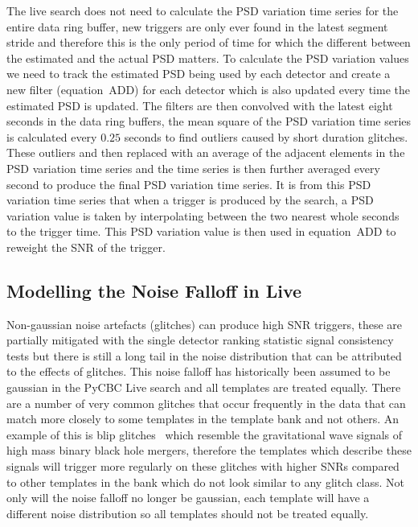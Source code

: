 The live search does not need to calculate the PSD variation time series for the entire data ring buffer, new triggers are only ever found in the latest segment stride and therefore this is the only period of time for which the different between the estimated and the actual PSD matters. To calculate the PSD variation values we need to track the estimated PSD being used by each detector and create a new filter (equation~ADD) for each detector which is also updated every time the estimated PSD is updated. The filters are then convolved with the latest eight seconds in the data ring buffers, the mean square of the PSD variation time series is calculated every $0.25$ seconds to find outliers caused by short duration glitches. These outliers and then replaced with an average of the adjacent elements in the PSD variation time series and the time series is then further averaged every second to produce the final PSD variation time series. It is from this PSD variation time series that when a trigger is produced by the search, a PSD variation value is taken by interpolating between the two nearest whole seconds to the trigger time. This PSD variation value is then used in equation~ADD to reweight the SNR of the trigger.

\subsection{\label{pycbclive-template-fits}Modelling the Noise Falloff in Live}

Non-gaussian noise artefacts (glitches) can produce high SNR triggers, these are partially mitigated with the single detector ranking statistic signal consistency tests but there is still a long tail in the noise distribution that can be attributed to the effects of glitches.
%
%
This noise falloff has historically been assumed to be gaussian in the PyCBC Live search and all templates are treated equally. There are a number of very common glitches that occur frequently in the data that can match more closely to some templates in the template bank and not others. An example of this is blip glitches~\cite{blips:2019} which resemble the gravitational wave signals of high mass binary black hole mergers, therefore the templates which describe these signals will trigger more regularly on these glitches with higher SNRs compared to other templates in the bank which do not look similar to any glitch class. Not only will the noise falloff no longer be gaussian, each template will have a different noise distribution so all templates should not be treated equally.

